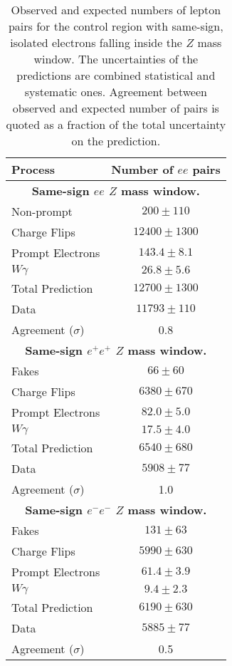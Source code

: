 \begin{table}[htbp]
\begin{center}
\begin{tabular}{l|c}
\hline
Process & Number of $ee$ pairs \\\hline\hline
%
\multicolumn{2}{c}{\textbf{Same-sign $ee$ $Z$ mass window.}} \\\hline 
        Non-prompt      & $200 \pm 110$ \\[+0.05in]
        Charge Flips & $12400 \pm 1300$ \\[+0.05in]
        Prompt Electrons & $143.4 \pm 8.1$ \\[+0.05in]
        $W\gamma$  & $26.8 \pm 5.6$ \\[+0.05in]
            \hline
        Total Prediction & $12700 \pm 1300$ \\[+0.05in]
            \hline
        Data       &       $11793 \pm 110$ \\[+0.05in]
            \hline
        Agreement ($\sigma$)  &      0.8 \\[+0.05in]
\hline \hline
\multicolumn{2}{c}{\textbf{Same-sign $e^{+}e^{+}$ $Z$ mass window.}} \\\hline 
        Fakes      & $66 \pm 60$ \\[+0.05in]
        Charge Flips & $6380 \pm 670$ \\[+0.05in]
        Prompt Electrons & $82.0 \pm 5.0$ \\[+0.05in]
        $W\gamma$  & $17.5 \pm 4.0$ \\[+0.05in]
            \hline
        Total Prediction & $6540 \pm 680$ \\[+0.05in]
            \hline
        Data       &        $5908 \pm 77$ \\[+0.05in]
            \hline
        Agreement ($\sigma$)  &     1.0 \\[+0.05in]
%
\hline \hline
\multicolumn{2}{c}{\textbf{Same-sign $e^{-}e^{-}$ $Z$ mass window.}} \\\hline 
        Fakes      & $131 \pm 63$ \\[+0.05in]
        Charge Flips & $5990 \pm 630$ \\[+0.05in]
        Prompt Electrons & $61.4 \pm 3.9$ \\[+0.05in]
        $W\gamma$  & $9.4 \pm 2.3$ \\[+0.05in]
            \hline
        Total Prediction & $6190 \pm 630$ \\[+0.05in]
            \hline
        Data       &        $5885 \pm 77$ \\[+0.05in]
            \hline
        Agreement ($\sigma$)  &     0.5 \\[+0.05in]
\hline 
\end{tabular}
\end{center}
\caption{Observed and expected numbers of lepton pairs for the control region with same-sign, isolated electrons falling inside the $Z$ mass window. 
The uncertainties of the predictions are combined statistical and systematic ones.
Agreement between observed and expected number of pairs is quoted as a fraction of the total uncertainty on the prediction.
}
\label{tab:ee_isoSS_Z}
\end{table}


